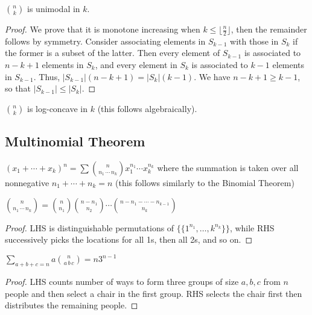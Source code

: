 \documentclass[a4paper]{article}
\begin{document}
\begin{theorem}
$\binom nk$ is unimodal in $k$.

\begin{hl}
\begin{proof}
We prove that it is monotone increasing when $k\leq\lfloor\frac n2\rfloor$, then the remainder follows by symmetry. Consider associating elements in $S_{k-1}$ with those in $S_k$ if the former is a subset of the latter. Then every element of $S_{k-1}$ is associated to $n-k+1$ elements in $S_k$, and every element in $S_k$ is associated to $k-1$ elements in $S_{k-1}$. Thus, $|S_{k-1}|(n-k+1)=|S_k|(k-1)$. We have $n-k+1\geq k-1$, so that $|S_{k-1}|\leq|S_k|$.
\end{proof}
\end{hl}
\end{theorem}

\begin{theorem}
$\binom nk$ is log-concave in $k$ (this follows algebraically).
\end{theorem}

\subsection{Multinomial Theorem}

\begin{theorem}
$\displaystyle (x_1+\cdots+x_k)^n=\sum\binom n{n_1\,\cdots\,n_k}x_1^{n_1}\cdots x_k^{n_k}$ where the summation is taken over all nonnegative $n_1+\cdots+n_k=n$ (this follows similarly to the Binomial Theorem)
\end{theorem}

\begin{theorem}
$\displaystyle \binom n{n_1\,\cdots\,n_k}=\binom n{n_1}\binom{n-n_1}{n_2}\cdots\binom{n-n_1-\cdots-n_{k-1}}{n_k}$

\begin{hl}
\begin{proof}
LHS is distinguishable permutations of $\{\{1^{n_1},\dots,k^{n_k}\}\}$, while RHS successively picks the locations for all 1s, then all 2s, and so on.
\end{proof}
\end{hl}
\end{theorem}

\begin{theorem}
$\displaystyle\sum_{a+b+c=n}a\binom n{a\,b\,c}=n3^{n-1}$

\begin{hl}
\begin{proof}
LHS counts number of ways to form three groups of size $a,b,c$ from $n$ people and then select a chair in the first group. RHS selects the chair first then distributes the remaining people.
\end{proof}
\end{hl}
\end{theorem}
\end{document}
